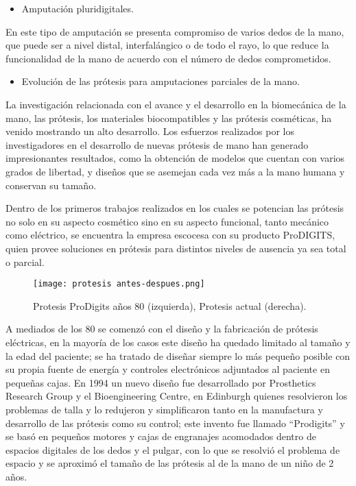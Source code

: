\documentclass[a4paper]{article}
\begin{document}
\begin{itemize}
    \item Amputación pluridigitales.
\end{itemize}
En este tipo de amputación se presenta compromiso de varios dedos de la mano, que puede ser a nivel distal, interfalángico o de todo el rayo, lo que reduce la funcionalidad de la mano de acuerdo con el número de dedos comprometidos. 

\begin{itemize}
    \item Evolución de las prótesis para amputaciones parciales de la mano.
\end{itemize}
 
La investigación relacionada con el avance y el desarrollo en la biomecánica de la mano, las prótesis, los materiales biocompatibles y las prótesis cosméticas, ha venido mostrando un alto desarrollo. Los esfuerzos realizados por los investigadores en el desarrollo de nuevas prótesis de mano han generado impresionantes resultados, como la obtención de modelos que cuentan con varios grados de libertad, y diseños que se asemejan cada vez más a la mano humana y conservan su tamaño.  

Dentro de los primeros trabajos realizados en los cuales se potencian las prótesis no solo en su aspecto cosmético sino en su aspecto funcional, tanto mecánico como eléctrico, se encuentra la empresa escocesa con su producto ProDIGITS, quien provee soluciones en prótesis para distintos niveles de ausencia ya sea total o parcial. 
\begin{figure}[h]
\centering
\texttt{[image: protesis antes-despues.png]}
\caption{\label{fig:biomec1}Protesis ProDigits años 80 (izquierda), Protesis actual (derecha).}
\end{figure}

A mediados de los 80 se comenzó con el diseño y la fabricación de prótesis eléctricas, en la mayoría de los casos este diseño ha quedado limitado al tamaño y la edad del paciente; se ha tratado de diseñar siempre lo más pequeño posible con su propia fuente de energía y controles electrónicos adjuntados al paciente en pequeñas cajas. En 1994 un nuevo diseño fue desarrollado por Prosthetics Research Group y el Bioengineering Centre, en Edinburgh quienes resolvieron los problemas de talla y lo redujeron y simplificaron tanto en la manufactura y desarrollo de las prótesis como su control; este invento fue llamado “Prodigits” y se basó en pequeños motores y cajas de engranajes acomodados dentro de espacios digitales de los dedos y el pulgar, con lo que se resolvió el problema de espacio y se aproximó el tamaño de las prótesis al de la mano de un niño de 2 años. 
\end{document}
